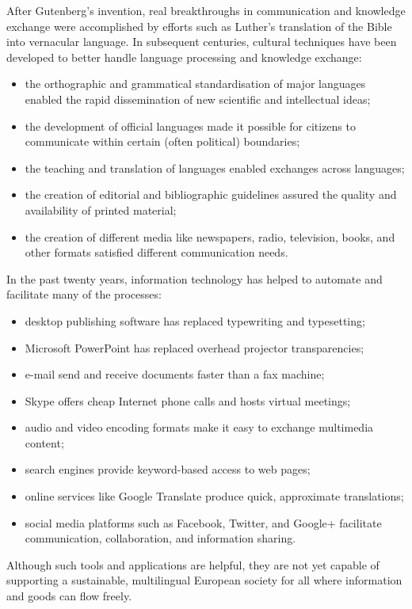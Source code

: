 \documentclass[]{../metanetpaper}
\begin{document}
\begin{Parallel}[c]{80mm}{80mm}
{    After Gutenberg’s invention, real breakthroughs in communication and knowledge exchange were accomplished by efforts such as Luther’s translation of the Bible into vernacular language. In subsequent centuries, cultural techniques have been developed to better handle language processing and knowledge exchange:
    \begin{itemize}
      \item the orthographic and grammatical standardisation of major languages enabled the rapid dissemination of new 
      scientific and intellectual ideas;
      \item the development of official languages made it possible for citizens to communicate within certain (often 
      political) boundaries;
      \item the teaching and translation of languages enabled exchanges across languages;
      \item the creation of editorial and bibliographic guidelines assured the quality and availability of printed 
      material;
      \item the creation of different media like newspapers, radio, television, books, and other formats satisfied 
      different communication needs. 
    \end{itemize}
    In the past twenty years, information technology has helped to automate and facilitate many of the processes:
    \begin{itemize}
      \item desktop publishing software has replaced typewriting and typesetting;
      \item Microsoft PowerPoint has replaced overhead projector transparencies;
      \item e-mail send and receive documents faster than a fax machine;
      \item Skype offers cheap Internet phone calls and hosts virtual meetings;
      \item audio and video encoding formats make it easy to exchange multimedia content;
      \item search engines provide keyword-based access to web pages;
      \item online services like Google Translate produce quick, approximate translations;
      \item social media platforms such as Facebook, Twitter, and Google+ facilitate communication, collaboration, and information sharing.
    \end{itemize}
    Although such tools and applications are helpful, they are not yet capable of supporting a sustainable, multilingual European society for all where information and goods can flow freely.
  }
  \ParallelPar



\end{Parallel}
\end{document}
